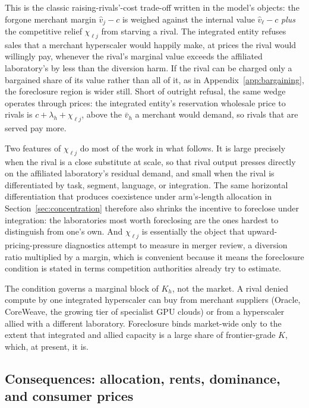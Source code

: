 \documentclass[11pt]{article}
\begin{document}
This is the classic raising-rivals'-cost trade-off written in the model's objects: the forgone merchant margin $\widehat v_j-c$ is weighed against the internal value $\widehat v_\ell-c$ \emph{plus} the competitive relief $\chi_{\ell j}$ from starving a rival. The integrated entity refuses sales that a merchant hyperscaler would happily make, at prices the rival would willingly pay, whenever the rival's marginal value exceeds the affiliated laboratory's by less than the diversion harm. If the rival can be charged only a bargained share of its value rather than all of it, as in Appendix~\ref{app:bargaining}, the foreclosure region is wider still. Short of outright refusal, the same wedge operates through prices: the integrated entity's reservation wholesale price to rivals is $c+\lambda_h+\chi_{\ell j}$, above the $\bar v_h$ a merchant would demand, so rivals that are served pay more.

Two features of $\chi_{\ell j}$ do most of the work in what follows. It is large precisely when the rival is a close substitute at scale, so that rival output presses directly on the affiliated laboratory's residual demand, and small when the rival is differentiated by task, segment, language, or integration. The same horizontal differentiation that produces coexistence under arm's-length allocation in Section~\ref{sec:concentration} therefore also shrinks the incentive to foreclose under integration: the laboratories most worth foreclosing are the ones hardest to distinguish from one's own. And $\chi_{\ell j}$ is essentially the object that upward-pricing-pressure diagnostics attempt to measure in merger review, a diversion ratio multiplied by a margin, which is convenient because it means the foreclosure condition is stated in terms competition authorities already try to estimate.

The condition governs a marginal block of $K_h$, not the market. A rival denied compute by one integrated hyperscaler can buy from merchant suppliers (Oracle, CoreWeave, the growing tier of specialist GPU clouds) or from a hyperscaler allied with a different laboratory. Foreclosure binds market-wide only to the extent that integrated and allied capacity is a large share of frontier-grade $K$, which, at present, it is.

\subsection{Consequences: allocation, rents, dominance, and consumer prices}
\label{sec:integration-consequences}
\end{document}
